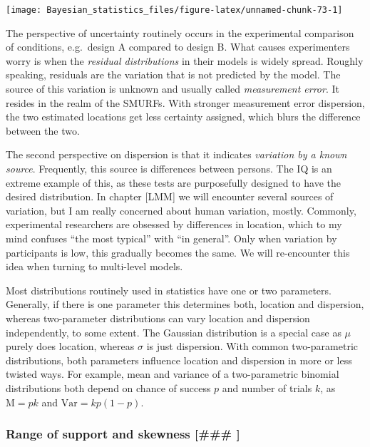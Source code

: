\documentclass[]{svmono}
\begin{document}
\texttt{[image: Bayesian\_statistics\_files/figure-latex/unnamed-chunk-73-1]}

The perspective of uncertainty routinely occurs in the experimental
comparison of conditions, e.g.~design A compared to design B. What
causes experimenters worry is when the \emph{residual distributions} in
their models is widely spread. Roughly speaking, residuals are the
variation that is not predicted by the model. The source of this
variation is unknown and usually called \emph{measurement error}. It
resides in the realm of the SMURFs. With stronger measurement error
dispersion, the two estimated locations get less certainty assigned,
which blurs the difference between the two.

The second perspective on dispersion is that it indicates
\emph{variation by a known source}. Frequently, this source is
differences between persons. The IQ is an extreme example of this, as
these tests are purposefully designed to have the desired distribution.
In chapter {[}LMM{]} we will encounter several sources of variation, but
I am really concerned about human variation, mostly. Commonly,
experimental researchers are obsessed by differences in location, which
to my mind confuses ``the most typical'' with ``in general''. Only when
variation by participants is low, this gradually becomes the same. We
will re-encounter this idea when turning to multi-level models.

Most distributions routinely used in statistics have one or two
parameters. Generally, if there is one parameter this determines both,
location and dispersion, whereas two-parameter distributions can vary
location and dispersion independently, to some extent. The Gaussian
distribution is a special case as \(\mu\) purely does location, whereas
\(\sigma\) is just dispersion. With common two-parametric distributions,
both parameters influence location and dispersion in more or less
twisted ways. For example, mean and variance of a two-parametric
binomial distributions both depend on chance of success \(p\) and number
of trials \(k\), as \(\textrm{M} = pk\) and \(\textrm{Var} = kp(1-p)\).

\subsubsection{Range of support and skewness {[}\#\#\#
{]}}\label{range-of-support-and-skewness}
\end{document}
